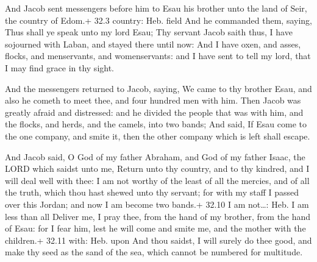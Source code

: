  And Jacob sent messengers before him to Esau his brother
unto the land of Seir, the country of Edom.+ 32.3 country: Heb. field
 And he commanded them, saying, Thus shall ye speak unto my
lord Esau; Thy servant Jacob saith thus, I have sojourned with Laban,
and stayed there until now:  And I have oxen, and asses,
flocks, and menservants, and womenservants: and I have sent to tell my
lord, that I may find grace in thy sight.

 And the messengers returned to Jacob, saying, We came to
thy brother Esau, and also he cometh to meet thee, and four hundred men
with him.  Then Jacob was greatly afraid and distressed: and
he divided the people that was with him, and the flocks, and herds, and
the camels, into two bands;  And said, If Esau come to the
one company, and smite it, then the other company which is left shall
escape.

 And Jacob said, O God of my father Abraham, and God of my
father Isaac, the LORD which saidst unto me, Return unto thy country,
and to thy kindred, and I will deal well with thee:  I am
not worthy of the least of all the mercies, and of all the truth, which
thou hast shewed unto thy servant; for with my staff I passed over this
Jordan; and now I am become two bands.+ 32.10 I am not\ldots: Heb. I am
less than all  Deliver me, I pray thee, from the hand of my
brother, from the hand of Esau: for I fear him, lest he will come and
smite me, and the mother with the children.+ 32.11 with: Heb. upon
 And thou saidst, I will surely do thee good, and make thy
seed as the sand of the sea, which cannot be numbered for multitude.

